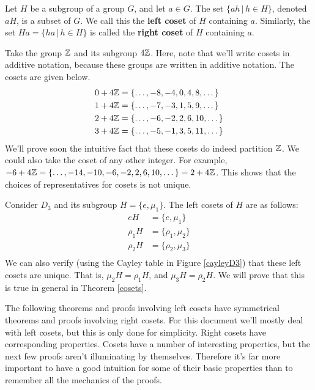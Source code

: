\begin{definition}
Let $H$ be a subgroup of a group $G$, and let $a \in G$. The set $\{ah \,|\, h \in H\}$, denoted $aH$, is a subset of $G$. We call this the \textbf{left coset} of $H$ containing $a$. Similarly, the set $Ha = \{ha \,|\, h \in H\}$ is called the \textbf{right coset} of $H$ containing $a$.
\end{definition}

\begin{example}
Take the group $\mathbb{Z}$ and its subgroup $4\mathbb{Z}$. Here, note that we'll write cosets in additive notation, because these groups are written in additive notation. The cosets are given below.
\begin{align*}
    0 + 4\mathbb{Z} &= \{\dots, -8, -4, 0, 4, 8, \dots\} \\
    1 + 4\mathbb{Z} &= \{\dots, -7, -3, 1, 5, 9, \dots\} \\
    2 + 4\mathbb{Z} &= \{\dots, -6, -2, 2, 6, 10, \dots\} \\
    3 + 4\mathbb{Z} &= \{\dots, -5, -1, 3, 5, 11, \dots\}
\end{align*}
We'll prove soon the intuitive fact that these cosets do indeed partition $\mathbb{Z}$. We could also take the coset of any other integer. For example, $-6 + 4\mathbb{Z} = \{\dots, -14, -10, -6, -2, 2, 6, 10, \dots\} = 2 + 4\mathbb{Z}$. This shows that the choices of representatives for cosets is not unique.
\end{example}

\begin{example}
Consider $D_3$ and its subgroup $H = \{e, \mu_1\}$. The left cosets of $H$ are as follows:
\begin{align*}
    eH      &= \{e, \mu_1\}      \\
    \rho_1H &= \{\rho_1, \mu_2\} \\
    \rho_2H &= \{\rho_2, \mu_3\} \\
\end{align*}
We can also verify (using the Cayley table in Figure \ref{cayleyD3}) that these left cosets are unique. That is, $\mu_2H = \rho_1H$, and $\mu_3H = \rho_2H$. We will prove that this is true in general in Theorem \ref{cosets}.
\end{example}

The following theorems and proofs involving left cosets have symmetrical theorems and proofs involving right cosets. For this document we'll mostly deal with left cosets, but this is only done for simplicity. Right cosets have corresponding properties. Cosets have a number of interesting properties, but the next few proofs  aren't illuminating by themselves. Therefore it's far more important to have a good intuition for some of their basic properties than to remember all the mechanics of the proofs.

